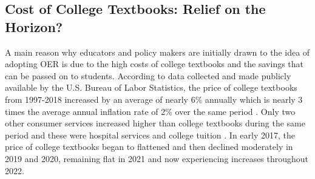 \documentclass[11pt]{article}
\newcommand{\alink}[2]{\href{#1}{\textcolor{blue}{#2}}}
\begin{document}
\subsection{Cost of College Textbooks: Relief on the Horizon?}
A main reason why educators and policy makers are initially drawn to the idea of adopting OER is due to the high costs of college textbooks and the savings that can be passed on to students.  According to data collected and made publicly available by the U.S. Bureau of Labor Statistics, the price of college textbooks from 1997-2018 increased by an average of nearly 6\% annually which is nearly 3 times the average annual inflation rate of 2\% over the same period \cite{bls}. Only two other consumer services increased higher than college textbooks during the same period and these were hospital services and college tuition \cite{perry2018}. %
In early 2017, the price of college textbooks began to flattened and then declined moderately in 2019 and 2020, remaining flat in 2021 and now experiencing increases throughout 2022.
\end{document}
